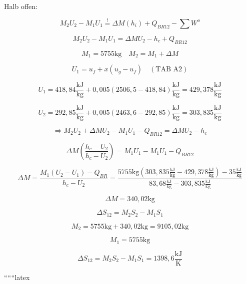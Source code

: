 Halb offen:

\[
M_2 U_2 - M_1 U_1 \stackrel{!}{=} \Delta M (h_i) + Q_{BR12} - \sum W^o
\]

\[
M_2 U_2 - M_1 U_1 = \Delta M U_2 - h_c + Q_{BR12}
\]

\[
M_1 = 5755 \text{kg} \quad M_2 = M_1 + \Delta M
\]

\[
U_1 = u_f + x (u_g - u_f) \quad (\text{TAB A2})
\]

\[
U_1 = 418,84 \frac{\text{kJ}}{\text{kg}} + 0,005 (2506,5 - 418,84) \frac{\text{kJ}}{\text{kg}} = 429,378 \frac{\text{kJ}}{\text{kg}}
\]

\[
U_2 = 292,85 \frac{\text{kJ}}{\text{kg}} + 0,005 (2463,6 - 292,85) \frac{\text{kJ}}{\text{kg}} = 303,835 \frac{\text{kJ}}{\text{kg}}
\]

\[
\Rightarrow M_2 U_2 + \Delta M U_2 - M_1 U_1 - Q_{BR12} = \Delta M U_2 - h_c
\]

\[
\Delta M \left( \frac{h_c - U_2}{h_c - U_2} \right) = M_1 U_1 - M_1 U_1 - Q_{BR12}
\]

\[
\Delta M = \frac{M_1 (U_2 - U_1) - Q_{BR}}{h_c - U_2} = \frac{5755 \text{kg} (303,835 \frac{\text{kJ}}{\text{kg}} - 429,378 \frac{\text{kJ}}{\text{kg}}) - 35 \frac{\text{kJ}}{\text{kg}}}{83,68 \frac{\text{kJ}}{\text{kg}} - 303,835 \frac{\text{kJ}}{\text{kg}}}
\]

\[
\Delta M = 340,02 \text{kg}
\]

\[
\Delta S_{12} = M_2 S_2 - M_1 S_1
\]

\[
M_2 = 5755 \text{kg} + 340,02 \text{kg} = 9105,02 \text{kg}
\]

\[
M_1 = 5755 \text{kg}
\]

\[
\Delta S_{12} = M_2 S_2 - M_1 S_1 = 1398,6 \frac{\text{kJ}}{\text{K}}
\]

``````latex


